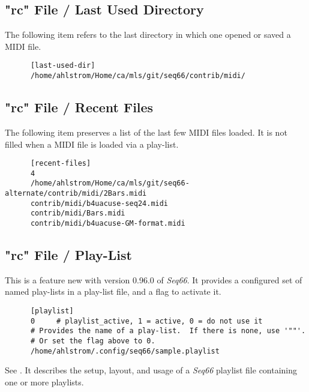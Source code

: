 \subsection{"rc" File / Last Used Directory}
\label{subsec:rc_file_last_used_dir}

   The following item refers to the last directory in which one opened or
   saved a MIDI file.

   \begin{verbatim}
      [last-used-dir]
      /home/ahlstrom/Home/ca/mls/git/seq66/contrib/midi/
   \end{verbatim}

\subsection{"rc" File / Recent Files}
\label{subsec:rc_file_recent_files}

   The following item preserves a list of the last few MIDI files loaded.
   It is not filled when a MIDI file is loaded via a play-list.

   \begin{verbatim}
      [recent-files]
      4
      /home/ahlstrom/Home/ca/mls/git/seq66-alternate/contrib/midi/2Bars.midi
      contrib/midi/b4uacuse-seq24.midi
      contrib/midi/Bars.midi
      contrib/midi/b4uacuse-GM-format.midi
   \end{verbatim}

\subsection{"rc" File / Play-List}
\label{subsec:rc_file_playlist}

   This is a feature new with version 0.96.0 of \textsl{Seq66}.
   It provides a configured set of named play-lists in a play-list file,
   and a flag to activate it.
   
   \index{[playlist]}
   \begin{verbatim}
      [playlist]
      0     # playlist_active, 1 = active, 0 = do not use it
      # Provides the name of a play-list.  If there is none, use '""'.
      # Or set the flag above to 0.
      /home/ahlstrom/.config/seq66/sample.playlist
   \end{verbatim}

   See .
   It describes the setup, layout, and usage of a
   \textsl{Seq66} playlist file containing one or more playlists.

